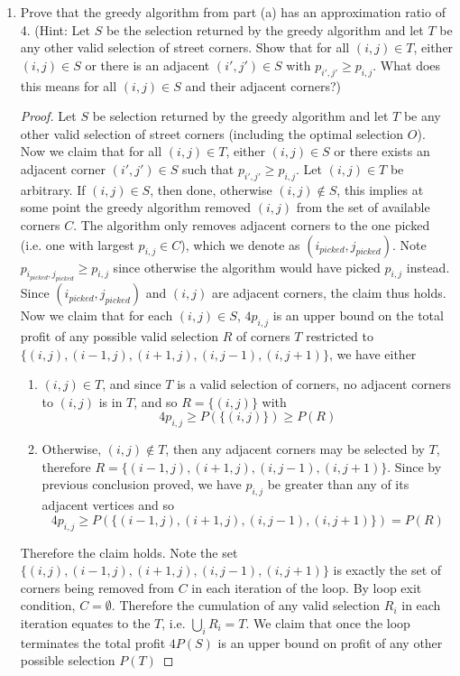 \documentclass[11pt]{article}
\begin{document}
\begin{enumerate}
\begin{solution}
    \end{solution}
    \item Prove that the greedy algorithm from part (a) has an approximation ratio of 4. (Hint: Let $S$ be the selection returned by the greedy algorithm and let $T$ be any other valid selection of street corners. Show that for all $(i,j) \in T$, either $(i,j) \in S$ or there is an adjacent $(i',j')\in S$ with $p_{i', j'} \geq p_{i,j}$. What does this means for all $(i,j) \in S$ and their adjacent corners?)
    \begin{proof}
        Let $S$ be selection returned by the greedy algorithm and let $T$ be any other valid selection of street corners (including the optimal selection $O$). Now we claim that for all $(i,j)\in T$, either $(i,j)\in S$ or there exists an adjacent corner $(i', j')\in S$ such that $p_{i', j'} \geq p_{i,j}$. Let $(i,j)\in T$ be arbitrary. If $(i,j)\in S$, then done, otherwise $(i,j)\not\in S$, this implies at some point the greedy algorithm removed $(i,j)$ from the set of available corners $C$. The algorithm only removes adjacent corners to the one picked (i.e. one with largest $p_{i,j} \in C$), which we denote as $(i_{picked}, j_{picked})$. Note $p_{i_{picked}, j_{picked}} \geq p_{i,j}$ since otherwise the algorithm would have picked $p_{i,j}$ instead. Since $(i_{picked}, j_{picked})$ and $(i,j)$ are adjacent corners, the claim thus holds. Now we claim that for each $(i,j)\in S$, $4p_{i,j}$ is an upper bound on the total profit of any possible valid selection $R$ of corners $T$ restricted to $\{ (i,j),(i-1,j),(i+1,j),(i,j-1),(i,j+1)\}$, we have either 
        \begin{enumerate}
            \item $(i, j)\in T$, and since $T$ is a valid selection of corners, no adjacent corners to $(i,j)$ is in $T$, and so $R = \{(i,j)\}$ with 
            \[
               4p_{i,j} \geq P(\{(i,j)\}) \geq P(R)
            \]
            \item Otherwise, $(i,j)\not\in T$, then any adjacent corners may be selected by $T$, therefore $R = \{(i-1,j),(i+1,j),(i,j-1),(i,j+1)\}$. Since by previous conclusion proved, we have $p_{i,j}$ be greater than any of its adjacent vertices and so 
            \[
                4p_{i,j} \geq P(\{(i-1,j),(i+1,j),(i,j-1),(i,j+1)\}) = P(R) 
            \]
        \end{enumerate}
        Therefore the claim holds. Note the set $\{(i,j),(i-1,j),(i+1,j),(i,j-1),(i,j+1)\}$ is exactly the set of corners being removed from $C$ in each iteration of the loop. By loop exit condition, $C = \emptyset$. Therefore the cumulation of any valid selection $R_i$ in each iteration equates to the $T$, i.e. $\bigcup_i R_i = T$. We claim that once the loop terminates the total profit $4P(S)$ is an upper bound on profit of any other possible selection $P(T)$

\end{proof}
\end{enumerate}
\end{document}
